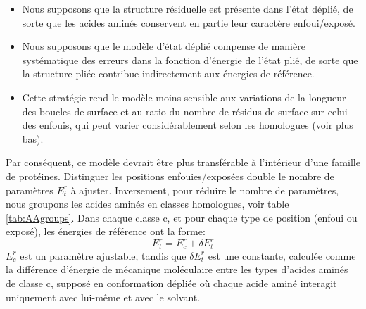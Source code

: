 \begin{itemize}
\item Nous supposons que la structure résiduelle est présente dans l'état déplié, de sorte que les acides aminés conservent en partie leur caractère enfoui/exposé.
\item Nous supposons que le modèle d'état déplié compense de manière systématique des erreurs dans la fonction d'énergie de l'état plié, de sorte que  la structure pliée contribue indirectement aux énergies de référence.
\item Cette stratégie rend le modèle moins sensible aux variations de la longueur des boucles de surface et au ratio  du nombre de résidus de surface sur  celui des enfouis, qui peut varier considérablement selon les homologues (voir plus bas).  
\end{itemize}
Par conséquent, ce modèle devrait être plus transférable à l'intérieur d'une famille de protéines. Distinguer les positions enfouies/exposées double le nombre de paramètres $E^r_t$ à ajuster. Inversement, pour réduire le nombre de paramètres, nous groupons les acides aminés en classes homologues, voir table \ref{tab:AAgroups}. Dans chaque classe c, et pour chaque type de position (enfoui ou exposé), les énergies de référence ont la forme:
\begin{equation}
E^r_t = E^r_c + \delta E^r_t
\end{equation}
$E^r_c$ est un paramètre ajustable, tandis que $\delta E^r_t$ est une constante, calculée comme la différence d'énergie de mécanique moléculaire entre les types d'acides aminés de classe c, supposé en conformation dépliée où chaque acide aminé interagit uniquement avec lui-même et avec le solvant.

